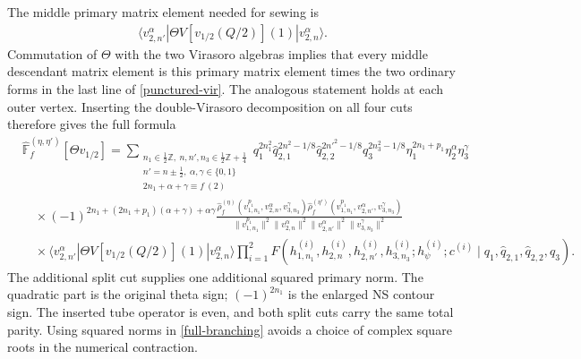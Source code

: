 \documentclass[12pt]{article}
\newcommand{\ie}{\begin{equation}\begin{aligned}}
\newcommand{\fe}{\end{aligned}\end{equation}}
\numberwithin{equation}{section}
\begin{document}
The middle primary matrix element needed for sewing is
\ie
 \langle v_{2,n'}^\alpha|\Theta V[v_{1/2}(Q/2)](1)
 |v_{2,n}^\alpha\rangle.
\fe
Commutation of $\Theta$ with the two Virasoro algebras implies that
every middle descendant matrix element is this primary matrix element
times the two ordinary forms in the last line of
\eqref{punctured-vir}.  The analogous statement holds at each outer
vertex.  Inserting the double-Virasoro decomposition on all four cuts
therefore gives the full formula
\begin{align}
 &\widehat{\mathbb F}_f^{(\eta,\eta')}[\Theta v_{1/2}]
 =\sum_{\substack{n_1\in\frac12\mathbb Z,\ n,n',n_3\in\frac12\mathbb Z+\frac14\\
 n'=n\pm\frac12,\ \alpha,\gamma\in\{0,1\}\\
 2n_1+\alpha+\gamma\equiv f\ (2)}}
 q_1^{2n_1^2}\hat q_{2,1}^{2n^2-1/8}
 \hat q_{2,2}^{2n'^2-1/8}q_3^{2n_3^2-1/8}
 \eta_1^{2n_1+p_1}\eta_2^\alpha\eta_3^\gamma\nonumber\\
 &\quad\times(-1)^{2n_1+(2n_1+p_1)(\alpha+\gamma)+\alpha\gamma}
 \frac{\hat\rho_f^{(\eta)}(v_{1,n_1}^{p_1},v_{2,n}^\alpha,v_{3,n_3}^\gamma)
       \hat\rho_f^{(\eta')}(v_{1,n_1}^{p_1},v_{2,n'}^\alpha,v_{3,n_3}^\gamma)}
 {\|v_{1,n_1}^{p_1}\|^2\|v_{2,n}^\alpha\|^2
  \|v_{2,n'}^\alpha\|^2\|v_{3,n_3}^\gamma\|^2}
 \nonumber\\
 &\quad\times\langle v_{2,n'}^\alpha|\Theta V[v_{1/2}(Q/2)](1)
       |v_{2,n}^\alpha\rangle
 \prod_{i=1}^2 F(h_{1,n_1}^{(i)},h_{2,n}^{(i)},h_{2,n'}^{(i)},h_{3,n_3}^{(i)};
 h_\psi^{(i)};c^{(i)}\mid q_1,\hat q_{2,1},\hat q_{2,2},q_3).
 \label{full-branching}
\end{align}
The additional split cut supplies one additional squared primary norm.
The quadratic part is the original theta sign; $(-1)^{2n_1}$ is the
enlarged NS contour sign.  The inserted tube operator is even, and both
split cuts carry the same total parity.  Using squared
norms in \eqref{full-branching} avoids a choice of complex square roots
in the numerical contraction.
\end{document}

